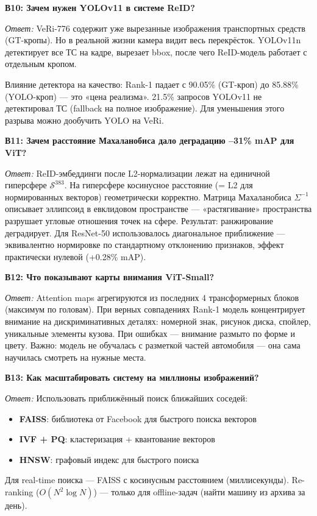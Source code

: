 \documentclass[a4paper, 12pt]{article}
\begin{document}
\vspace{1em}
\textbf{В10: Зачем нужен YOLOv11 в системе ReID?}

\textit{Ответ:} VeRi-776 содержит уже вырезанные изображения транспортных средств (GT-кропы). Но в реальной жизни камера видит весь перекрёсток. YOLOv11n детектирует все ТС на кадре, вырезает bbox, после чего ReID-модель работает с отдельным кропом.

Влияние детектора на качество: Rank-1 падает с 90.05\% (GT-кроп) до 85.88\% (YOLO-кроп) --- это «цена реализма». 21.5\% запросов YOLOv11 не детектировал ТС (fallback на полное изображение). Для уменьшения этого разрыва можно дообучить YOLO на VeRi.

\vspace{1em}
\textbf{В11: Зачем расстояние Махаланобиса дало деградацию –31\% mAP для ViT?}

\textit{Ответ:} ReID-эмбеддинги после L2-нормализации лежат на единичной гиперсфере $\mathcal{S}^{383}$. На гиперсфере косинусное расстояние (= L2 для нормированных векторов) геометрически корректно. Матрица Махаланобиса $\Sigma^{-1}$ описывает эллипсоид в евклидовом пространстве --- «растягивание» пространства разрушает угловые отношения точек на сфере. Результат: ранжирование деградирует. Для ResNet-50 использовалось диагональное приближение --- эквивалентно нормировке по стандартному отклонению признаков, эффект практически нулевой (+0.28\% mAP).

\vspace{1em}
\textbf{В12: Что показывают карты внимания ViT-Small?}

\textit{Ответ:} Attention maps агрегируются из последних 4 трансформерных блоков (максимум по головам). При верных совпадениях Rank-1 модель концентрирует внимание на дискриминативных деталях: номерной знак, рисунок диска, спойлер, уникальные элементы кузова. При ошибках --- внимание размыто по форме и цвету. Важно: модель не обучалась с разметкой частей автомобиля --- она сама научилась смотреть на нужные места.

\vspace{1em}
\textbf{В13: Как масштабировать систему на миллионы изображений?}

\textit{Ответ:} Использовать приближённый поиск ближайших соседей:
\begin{itemize}
  \item \textbf{FAISS}: библиотека от Facebook для быстрого поиска векторов
  \item \textbf{IVF + PQ}: кластеризация + квантование векторов
  \item \textbf{HNSW}: графовый индекс для быстрого поиска
\end{itemize}
Для real-time поиска --- FAISS с косинусным расстоянием (миллисекунды). Re-ranking ($O(N^2\log N)$) --- только для offline-задач (найти машину из архива за день).
\end{document}
